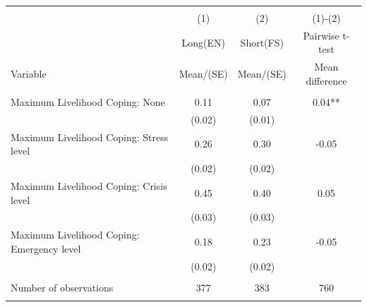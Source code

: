 
\begin{tabular}{@{\extracolsep{5pt}}lccc}
\\[-1.8ex]\hline \hline \\[-1.8ex]
 & \multicolumn{1}{c}{(1)}  & \multicolumn{1}{c}{(2)}  & \multicolumn{1}{c}{(1)-(2)} \\
 & \multicolumn{1}{c}{Long(EN)}  & \multicolumn{1}{c}{Short(FS)}  & \multicolumn{1}{c}{Pairwise t-test}  \\
Variable & Mean/(SE) & Mean/(SE) & Mean difference \\ \hline \\[-1.8ex] 
Maximum Livelihood Coping: None   & 0.11    & 0.07    & 0.04**   \\
 & (0.02)  & (0.01)  &  \\ [1ex]
Maximum Livelihood Coping: Stress level   & 0.26    & 0.30    & -0.05   \\
 & (0.02)  & (0.02)  &  \\ [1ex]
Maximum Livelihood Coping: Crisis level   & 0.45    & 0.40    & 0.05   \\
 & (0.03)  & (0.03)  &  \\ [1ex]
Maximum Livelihood Coping: Emergency level   & 0.18    & 0.23    & -0.05   \\
 & (0.02)  & (0.02)  &  \\ [1ex]
\hline \\[-1.8ex]
Number of observations  & 377   & 383  & 760  \\
\hline \hline \\[-1.8ex]

\end{tabular}
